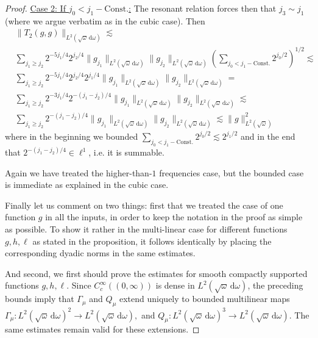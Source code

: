 \documentclass[10pt,a4paper]{amsart}
\newcommand{\dd}{{\, \mathrm d}}
\begin{document}
\begin{proof}
\noindent
  \underline{Case 2: If $j_0 < j_1 - \text{Const.}$:} The resonant relation forces then that $j_3 \sim j_1$ (where we argue verbatim as in the cubic case). 
        Then \begin{align*}
           &\|T_2(g,g) \|_{L^2(\sqrt{\omega}\dd\omega)}\lesssim \\
& \sum_{j_1\geq j_2} 2^{-5j_1/4}2^{j_2/4}\|g_{j_1}\|_{L^2(\sqrt{\omega}\dd\omega)} \|g_{j_2}\|_{L^2(\sqrt{\omega}\dd\omega)} \left(\sum_{j_0<j_1 - \text{Const.}}  2^{j_0/2}\right)^{1/2} \lesssim  \\
& \sum_{j_1\geq j_2} 2^{-5j_1/4}2^{j_2/4}2^{j_1/4}\|g_{j_1}\|_{L^2(\sqrt{\omega}\dd\omega)} \|g_{j_2}\|_{L^2(\sqrt{\omega}\dd\omega)}=\\
& 
\sum_{j_1\geq j_2} 2^{-3j_1/4}2^{-(j_1-j_2)/4} \|g_{j_1}\|_{L^2(\sqrt{\omega}\dd\omega)} \|g_{j_2}\|_{L^2(\sqrt{\omega}\dd\omega)} 
\lesssim
\\ &  
\sum_{j_1\geq j_2} 2^{-(j_1-j_2)/4} \|g_{j_1}\|_{L^2(\sqrt{\omega}\dd\omega)} \|g_{j_2}\|_{L^2(\sqrt{\omega}\dd\omega)}  \lesssim \|g\|_{L^2(\sqrt{\omega})}^2
\end{align*}
where in the beginning we bounded $\sum_{j_0<j_1 - \text{Const.}}  2^{j_0/2}\lesssim 2^{j_1/2}$ and in the end that $2^{-(j_1-j_2)/4} \in \ell^1$, i.e. it is summable.

Again we have treated the higher-than-$1$ frequencies case, but the bounded case is immediate as explained in the cubic case. 

Finally let us comment on two things: first that we treated the case of one function $g$ in all the inputs, in order to keep the notation in the proof as simple as possible. To show it rather in the multi-linear case for different functions $g, h, \ell$ as stated in the proposition, it follows identically by placing the corresponding dyadic norms in the same estimates. 

And second, we first should prove the estimates for smooth compactly supported functions $g,h,\ell$. Since $C_c^\infty((0,\infty))$ is dense in $L^2(\sqrt{\omega}\dd\omega)$, the preceding bounds imply that $\Gamma_\mu$ and $Q_\mu$ extend uniquely to bounded multilinear maps
$ \Gamma_\mu: L^2(\sqrt{\omega}\dd\omega)^2
\to L^2(\sqrt{\omega}\dd\omega),
$
and
$Q_\mu: L^2(\sqrt{\omega}\dd\omega)^3
\to L^2(\sqrt{\omega}\dd\omega).$
The same estimates remain valid for these extensions. 
\end{proof}
\end{document}
